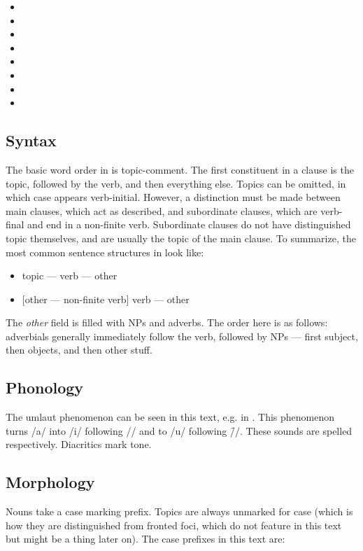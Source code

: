 \begin{itemize}
\item {} 
\item {} 
\item {} 
\item {} 
\item {} 
\item {} 
\item {} 
\item {} 
\end{itemize}

\subsection{Syntax}
The basic word order in \lang{} is topic-comment. The first constituent in a clause is the topic, followed by the verb, and then everything else. Topics can be omitted, in which case \lang{} appears verb-initial. However, a distinction must be made between main clauses, which act as described, and subordinate clauses, which are verb-final and end in a non-finite verb. Subordinate clauses do not have distinguished topic themselves, and are usually the topic of the main clause. To summarize, the most common sentence structures in \lang{}  look like:

\begin{itemize}
\item topic — verb — other
\item{} [other — non-finite verb] verb — other
\end{itemize}

The \emph{other} field is filled with NPs and adverbs. The order here is as follows: adverbials generally immediately follow the verb, followed by NPs — first subject, then objects, and then other stuff.

\subsection{Phonology}
The umlaut phenomenon can be seen in this text, e.g. in . This phenomenon turns /a/ into /i/ following /\s{}/ and to /u/ following /\f{}/. These sounds are spelled  respectively. Diacritics mark tone.

\subsection{Morphology}
Nouns take a case marking prefix. Topics are always unmarked for case (which is how they are distinguished from fronted foci, which do not feature in this text but might be a thing later on). The case prefixes in this text are:

